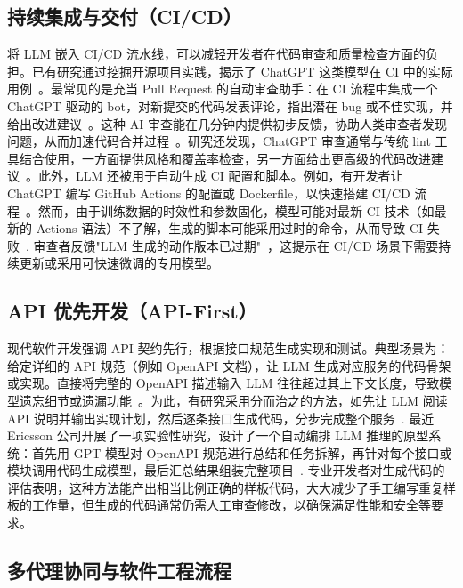 \subsection{持续集成与交付（CI/CD）}

将 LLM 嵌入 CI/CD 流水线，可以减轻开发者在代码审查和质量检查方面的负担。已有研究通过挖掘开源项目实践，揭示了 ChatGPT 这类模型在 CI 中的实际用例~\cite{ChatGPTUsage2023}。最常见的是充当 Pull Request 的自动审查助手：在 CI 流程中集成一个 ChatGPT 驱动的 bot，对新提交的代码发表评论，指出潜在 bug 或不佳实现，并给出改进建议~\cite{ChatGPTUsage2023}。这种 AI 审查能在几分钟内提供初步反馈，协助人类审查者发现问题，从而加速代码合并过程~\cite{ChatGPTUsage2023}。研究还发现，ChatGPT 审查通常与传统 lint 工具结合使用，一方面提供风格和覆盖率检查，另一方面给出更高级的代码改进建议~\cite{ChatGPTUsage2023}。此外，LLM 还被用于自动生成 CI 配置和脚本。例如，有开发者让 ChatGPT 编写 GitHub Actions 的配置或 Dockerfile，以快速搭建 CI/CD 流程~\cite{ChatGPTUsage2023}。然而，由于训练数据的时效性和参数固化，模型可能对最新 CI 技术（如最新的 Actions 语法）不了解，生成的脚本可能采用过时的命令，从而导致 CI 失败~\cite{ChatGPTUsage2023}. 审查者反馈"LLM 生成的动作版本已过期"~\cite{ChatGPTUsage2023}，这提示在 CI/CD 场景下需要持续更新或采用可快速微调的专用模型。

\subsection{API 优先开发（API-First）}

现代软件开发强调 API 契约先行，根据接口规范生成实现和测试。典型场景为：给定详细的 API 规范（例如 OpenAPI 文档），让 LLM 生成对应服务的代码骨架或实现。直接将完整的 OpenAPI 描述输入 LLM 往往超过其上下文长度，导致模型遗忘细节或遗漏功能~\cite{DivaCopilot}。为此，有研究采用分而治之的方法，如先让 LLM 阅读 API 说明并输出实现计划，然后逐条接口生成代码，分步完成整个服务~\cite{DivaCopilot}. 最近 Ericsson 公司开展了一项实验性研究，设计了一个自动编排 LLM 推理的原型系统：首先用 GPT 模型对 OpenAPI 规范进行总结和任务拆解，再针对每个接口或模块调用代码生成模型，最后汇总结果组装完整项目~\cite{DivaCopilot,DivaCopilot}. 专业开发者对生成代码的评估表明，这种方法能产出相当比例正确的样板代码，大大减少了手工编写重复样板的工作量，但生成的代码通常仍需人工审查修改，以确保满足性能和安全等要求。

\subsection{多代理协同与软件工程流程}

